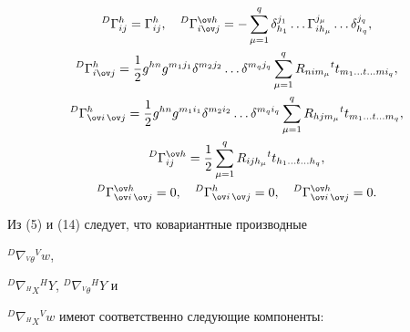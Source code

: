 \begin{gather}


{}^D\Gamma^h_{ij}=\Gamma^h_{ij},\quad


{}^D\Gamma^{\ov h}_{i{\ov j}}=-\sum^q_{\mu=1}


\delta^{j_1}_{h_1}\dotsc \Gamma^{j_\mu}_{ih_\mu}\dotsc


\delta^{j_q}_{h_q},\notag \\


{}^D\Gamma^h_{i{\ov j}}=\frac{1}{2}g^{hn}g^{m_1j_1}


\delta^{m_2j_2}\dotsc \delta^{m_q j_q}\sum^q_{\mu=1}


R_{nim_\mu}{}^t t_{m_1\dotsc t\dotsc mi_q},\notag \\


%


{}^D\Gamma^h_{{\ov i}\,{\ov j}}=\frac{1}{2}g^{hn}g^{m_1i_1}


\delta^{m_2i_2}\dotsc \delta^{m_q i_q}\sum^q_{\mu=1}


R_{hjm_\mu}{}^t t_{m_1\dotsc t\dotsc m_q}, \\


%


{}^D\Gamma^{\ov h}_{ij}=\frac{1}{2}\sum^q_{\mu=1}


R_{ijh_\mu}{}^t t_{h_1\dotsc t\dotsc h_q},\notag \\


%


{}^D\Gamma^{\ov h}_{{\ov i}\,{\ov j}}=0,\quad {}^D\Gamma^h_{{\ov i}\,{\ov j}}


=0,\quad {}^D\Gamma^{\ov h}_{{\ov i}\,\ov j}=0.\notag


\end{gather}


Из (5) и (14) следует, что ковариантные производные


${}^D\nabla_{{}^V\theta}{}^Vw$,


${}^D\nabla_{{}^HX}{}^HY$, ${}^D\nabla_{{}^V\theta}{}^HY$ и


${}^D\nabla_{{}^HX}{}^Vw$ имеют соответственно следующие компоненты:


